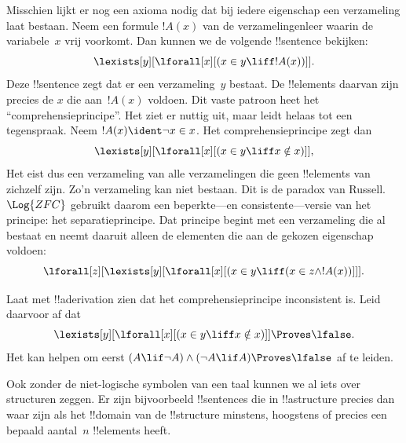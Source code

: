 \documentclass[openany]{memoir}
\begin{document}
Misschien lijkt er nog een axioma nodig dat bij iedere eigenschap een
verzameling laat bestaan. Neem een formule $!A(x)$ van de
verzamelingenleer waarin de variabele~$x$ vrij voorkomt. Dan kunnen we
de volgende !!{sentence} bekijken:
\[
\lexists[y][\lforall[x][(x \in y \liff !A(x))]].
\]
Deze !!{sentence} zegt dat er een verzameling~$y$ bestaat. De
!!{element}s daarvan zijn precies de $x$ die aan~$!A(x)$ voldoen. Dit
vaste patroon heet het ``comprehensieprincipe''. Het ziet er nuttig uit,
maar leidt helaas tot een tegenspraak. Neem $!A(x) \ident \lnot x \in
x$. Het comprehensieprincipe zegt dan
\[
\lexists[y][\lforall[x][(x \in y \liff x \notin x)]],
\]
Het eist dus een verzameling van alle verzamelingen die geen
!!{element}s van zichzelf zijn. Zo'n verzameling kan niet bestaan. Dit
is de paradox van Russell. $\Log{ZFC}$ gebruikt daarom een
beperkte---en consistente---versie van het principe: het
separatieprincipe. Dat principe begint met een verzameling die al
bestaat en neemt daaruit alleen de elementen die aan de gekozen
eigenschap voldoen:
\[
\lforall[z][\lexists[y][\lforall[x][(x \in y \liff (x \in z \land
      !A(x))]]].
\]

\begin{prob}
Laat met !!a{derivation} zien dat het comprehensieprincipe inconsistent
is. Leid daarvoor af dat
\[
\lexists[y][\lforall[x][(x \in y \liff x \notin x)]] \Proves \lfalse.
\]
Het kan helpen om eerst $(A \lif \lnot A) \land (\lnot A \lif A)
\Proves \lfalse$ af te leiden.
\end{prob}
\endgroup

\begingroup
\def\olfilename{OLP-0173}
\def\olfilepath{content/first-order-logic/models-theories/}
\hypertarget{unit-OLP-0173}{}





\begin{explain}
Ook zonder de niet-logische symbolen van een taal kunnen we al iets
over structuren zeggen. Er zijn bijvoorbeeld !!{sentence}s die in
!!a{structure} precies dan waar zijn als het !!{domain} van de
!!{structure} minstens, hoogstens of precies een bepaald aantal~$n$
!!{element}s heeft.
\end{explain}
\end{document}
